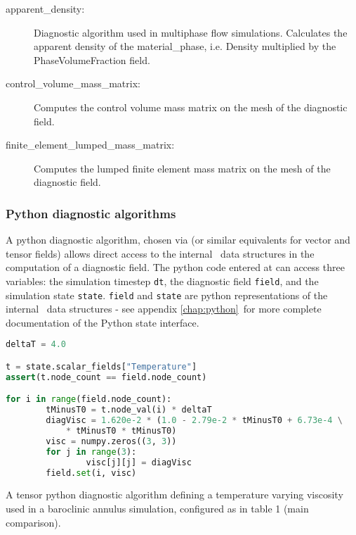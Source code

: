 \begin{description}
\item[apparent\_density:]Diagnostic algorithm used in multiphase flow simulations. Calculates the apparent density of the material\_phase, i.e. Density multiplied by the PhaseVolumeFraction field.
\item[control\_volume\_mass\_matrix:]Computes the control volume mass matrix on the mesh of the diagnostic field.
\item[finite\_element\_lumped\_mass\_matrix:]Computes the lumped finite element mass matrix on the mesh of the diagnostic field.
\end{description}        


\subsubsection{Python diagnostic algorithms}

A python diagnostic algorithm, chosen via 
(or similar equivalents for vector and tensor fields) allows direct access to the
internal \fluidity\ data structures in the computation of a diagnostic field. The
python code entered at 
can access three variables: the simulation timestep \lstinline[language = Python]*dt*,
the diagnostic field \lstinline[language = Python]*field*, and the simulation state
\lstinline[language = Python]*state*. \lstinline[language = Python]*field* and
\lstinline[language = Python]*state* are python representations of the internal
\fluidity\ data structures - see appendix \ref{chap:python}\ for more
complete documentation of the Python state interface.

\begin{example}
\begin{lstlisting}[language = Python]
deltaT = 4.0

t = state.scalar_fields["Temperature"]
assert(t.node_count == field.node_count)

for i in range(field.node_count):
        tMinusT0 = t.node_val(i) * deltaT
        diagVisc = 1.620e-2 * (1.0 - 2.79e-2 * tMinusT0 + 6.73e-4 \
            * tMinusT0 * tMinusT0)
        visc = numpy.zeros((3, 3))
        for j in range(3):
                visc[j][j] = diagVisc
        field.set(i, visc)
\end{lstlisting}
\caption{A tensor python diagnostic algorithm defining a temperature varying
         viscosity used in a baroclinic annulus simulation, configured
         as in \citet{hignett1985} table 1 (main comparison).}
\end{example}

